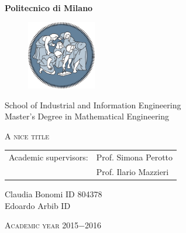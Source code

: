 \begin{center}
\large \textbf{Politecnico di Milano}
\end{center}
%
\begin{figure}[h]
\begin{center}
\includegraphics[height=3cm]{img/polimiLogo}
\end{center}
\end{figure}
%
\begin{center}
	\large School of Industrial and Information Engineering \\
  \vspace{6pt} Master's Degree in Mathematical Engineering \\
\end{center}
%
\vspace{60pt}
\begin{center}
\LARGE \textsc{A nice title}
\end{center}
\vspace{60pt}
\begin{flushleft}
\large
\begin{tabular}{ll}
	Academic supervisors:& Prof. Simona Perotto \\
                       & Prof. Ilario Mazzieri \\

\end{tabular}
\end{flushleft}
\vspace{10pt}
\begin{flushright}
\large Claudia Bonomi  \vspace{6pt}  ID 804378 \\
\large Edoardo Arbib  \vspace{6pt}   ID 
\end{flushright}
\vfill
\begin{center}
\large \textsc{Academic year 2015$-$2016}
\end{center}